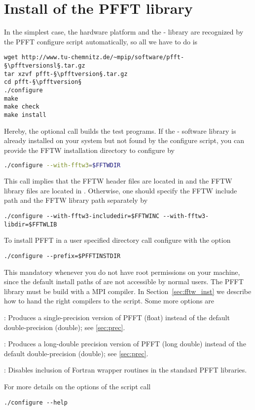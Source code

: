 \section{Install of the PFFT library}\label{sec:pfft-inst}
In the simplest case, the hardware platform and the \fftw-\fftwversion{} library are
recognized by the PFFT configure script automatically, so all we have to do is
\begin{lstlisting}[escapechar=§]
wget http://www.tu-chemnitz.de/~mpip/software/pfft-§\pfftversionsl§.tar.gz
tar xzvf pfft-§\pfftversion§.tar.gz
cd pfft-§\pfftversion§
./configure
make
make check
make install
\end{lstlisting}
Hereby, the optional call  builds the test programs.
If the \fftw-\fftwversion{} software library is already installed on your system but not found by the configure script,
you can provide the FFTW installation directory  to configure by
\begin{lstlisting}[language=bash]
./configure --with-fftw3=$FFTWDIR
\end{lstlisting}
This call implies that the FFTW header files are located in  and the FFTW library files are located
in . Otherwise, one should specify the FFTW include path  and the FFTW library path
 separately by
\begin{lstlisting}[prebreak = {\textbackslash}]
./configure --with-fftw3-includedir=$FFTWINC --with-fftw3-libdir=$FFTWLIB
\end{lstlisting}
To install PFFT in a user specified directory  call configure with the option
\begin{lstlisting}
./configure --prefix=$PFFTINSTDIR
\end{lstlisting}
This mandatory whenever you do not have root permissions on your machine, since the default install paths of 
 are not accessible by normal users.
The PFFT library must be build with a MPI compiler. In Section~\ref{sec:fftw_inst} we describe how to hand the right compilers to the  script.
Some more options are
\begin{compactitem}
  \item {}: Produces a single-precision version of PFFT (float) instead of the default double-precision (double); see \ref{sec:prec}.
  \item {}: Produces a long-double precision version of PFFT (long double) instead of the default double-precision (double); see \ref{sec:prec}.
  \item {}: Disables inclusion of Fortran wrapper routines in the standard PFFT libraries.
\end{compactitem}
For more details on the options of the  script call
\begin{lstlisting}
./configure --help
\end{lstlisting}


